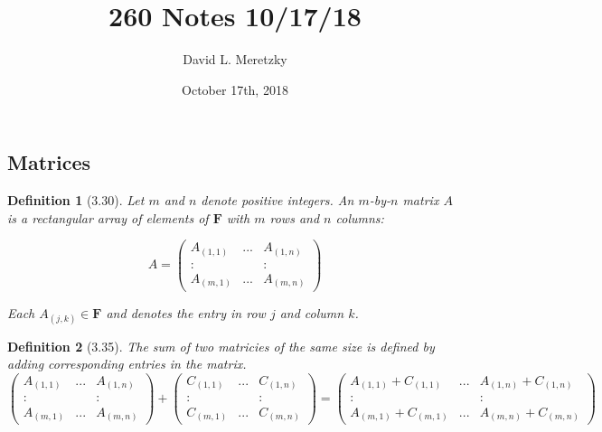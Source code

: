 \documentclass{article}
\title{ \vspace{-10ex} %
260 Notes 10/17/18
}
\author{David L. Meretzky
}
\date{%
October 17th, 2018
}
\theoremstyle{problemstyle}
\newtheorem{definition}{Definition}
\begin{document}
\maketitle
\subsection*{Matrices}

\begin{definition}[3.30]
Let $m$ and $n$ denote positive integers. An $m$-by-$n$ matrix $A$ is a rectangular array of elements of $\textbf{F}$ with $m$ rows and $n$ columns: 

\begin{equation}
A = 
\begin{pmatrix} A_{(1,1)} & ... & A_{(1,n)} \\ : &  & : \\ A_{(m,1)} & ... & A_{(m,n)} \end{pmatrix}
\end{equation}

Each $A_{(j,k)} \in \textbf{F}$ and denotes the entry in row $j$ and column $k$. 

\end{definition}

\begin{definition}[3.35]
The sum of two matricies of the same size is defined by adding corresponding entries in the matrix. 
\begin{equation}
\begin{pmatrix} A_{(1,1)} & ... & A_{(1,n)} \\ : &  & : \\ A_{(m,1)} & ... & A_{(m,n)} \end{pmatrix}
+ \begin{pmatrix} C_{(1,1)} & ... & C_{(1,n)} \\ : &  & : \\ C_{(m,1)} & ... & C_{(m,n)} \end{pmatrix} = 
\begin{pmatrix} A_{(1,1)}+C_{(1,1)} & ... & A_{(1,n)}+C_{(1,n)} \\ : &  & : \\ A_{(m,1)}+C_{(m,1)} & ... & A_{(m,n)}+C_{(m,n)} \end{pmatrix}
\end{equation}

\end{definition}
\end{document}
